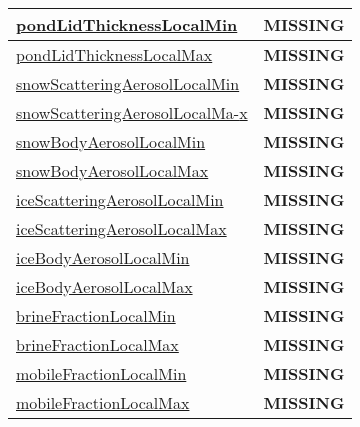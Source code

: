 {\begin{center}
\begin{longtable}{| p{2.0in} | p{4.0in} |}
    \hyperref[subsec:var_sec_tracer_monotonicity_pondLidThicknessLocalMin]{pondLidThicknessLocalMin} & {\bf \color{red} MISSING} \\
    \hline
    \hyperref[subsec:var_sec_tracer_monotonicity_pondLidThicknessLocalMax]{pondLidThicknessLocalMax} & {\bf \color{red} MISSING} \\
    \hline
    \hyperref[subsec:var_sec_tracer_monotonicity_snowScatteringAerosolLocalMin]{snowScatteringAerosolLocalMin} & {\bf \color{red} MISSING} \\
    \hline
    \hyperref[subsec:var_sec_tracer_monotonicity_snowScatteringAerosolLocalMax]{snowScatteringAerosolLocalMa-}\hyperref[subsec:var_sec_tracer_monotonicity_snowScatteringAerosolLocalMax]{x  }& {\bf \color{red} MISSING} \\
    \hline
    \hyperref[subsec:var_sec_tracer_monotonicity_snowBodyAerosolLocalMin]{snowBodyAerosolLocalMin} & {\bf \color{red} MISSING} \\
    \hline
    \hyperref[subsec:var_sec_tracer_monotonicity_snowBodyAerosolLocalMax]{snowBodyAerosolLocalMax} & {\bf \color{red} MISSING} \\
    \hline
    \hyperref[subsec:var_sec_tracer_monotonicity_iceScatteringAerosolLocalMin]{iceScatteringAerosolLocalMin} & {\bf \color{red} MISSING} \\
    \hline
    \hyperref[subsec:var_sec_tracer_monotonicity_iceScatteringAerosolLocalMax]{iceScatteringAerosolLocalMax} & {\bf \color{red} MISSING} \\
    \hline
    \hyperref[subsec:var_sec_tracer_monotonicity_iceBodyAerosolLocalMin]{iceBodyAerosolLocalMin} & {\bf \color{red} MISSING} \\
    \hline
    \hyperref[subsec:var_sec_tracer_monotonicity_iceBodyAerosolLocalMax]{iceBodyAerosolLocalMax} & {\bf \color{red} MISSING} \\
    \hline
    \hyperref[subsec:var_sec_tracer_monotonicity_brineFractionLocalMin]{brineFractionLocalMin} & {\bf \color{red} MISSING} \\
    \hline
    \hyperref[subsec:var_sec_tracer_monotonicity_brineFractionLocalMax]{brineFractionLocalMax} & {\bf \color{red} MISSING} \\
    \hline
    \hyperref[subsec:var_sec_tracer_monotonicity_mobileFractionLocalMin]{mobileFractionLocalMin} & {\bf \color{red} MISSING} \\
    \hline
    \hyperref[subsec:var_sec_tracer_monotonicity_mobileFractionLocalMax]{mobileFractionLocalMax} & {\bf \color{red} MISSING} \\

\end{longtable}
\end{center}}
